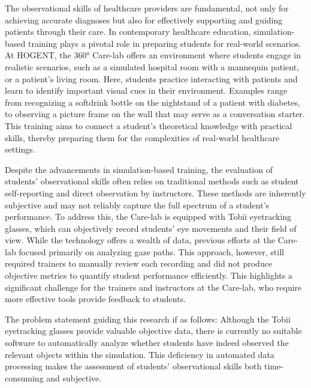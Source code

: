 \documentclass[english]{hogent-article}
\begin{document}
The observational skills of healthcare providers are fundamental, not only for achieving accurate diagnoses but also for effectively supporting and guiding patients through their care.
In contemporary healthcare education, simulation-based training plays a pivotal role in preparing students for real-world scenarios.
At HOGENT, the 360° Care-lab offers an environment where students engage in realistic scenarios, such as a simulated hospital room with a mannequin patient, or a patient's living room.
Here, students practice interacting with patients and learn to identify important visual cues in their environment.
Examples range from recognizing a softdrink bottle on the nightstand of a patient with diabetes, to observing a picture frame on the wall that may serve as a conversation starter.
This training aims to connect a student's theoretical knowledge with practical skills, thereby preparing them for the complexities of real-world healthcare settings.

Despite the advancements in simulation-based training, the evaluation of students' observational skills often relies on traditional methods such as student self-reporting and direct observation by instructors.
These methods are inherently subjective and may not reliably capture the full spectrum of a student's performance.
To address this, the Care-lab is equipped with Tobii eyetracking glasses, which can objectively record students' eye movements and their field of view. 
While the technology offers a wealth of data, previous efforts at the Care-lab focused primarily on analyzing gaze paths.
This approach, however, still required trainers to manually review each recording and did not produce objective metrics to quantify student performance efficiently.
This highlights a significant challenge for the trainers and instructors at the Care-lab, who require more effective tools provide feedback to students.

The problem statement guiding this research if as follows: Although the Tobii eyetracking glasses provide valuable objective data, there is currently no suitable software to automatically analyze whether
students have indeed observed the relevant objects within the simulation. This deficiency in automated data processing makes the assessment of students' observational skills both time-consuming and subjective.
\end{document}
